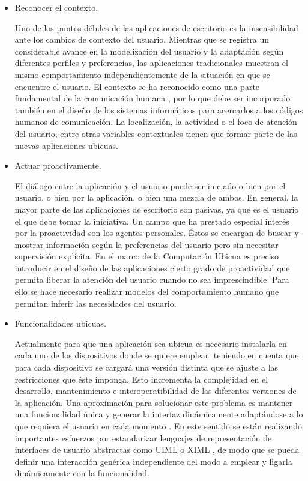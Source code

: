 \begin{itemize}
 
\item Reconocer el contexto. 

Uno de los puntos débiles de las aplicaciones de escritorio es la insensibilidad
ante los cambios de contexto del usuario.
Mientras que se registra un considerable avance en la modelización del usuario
y la adaptación según diferentes perfiles y preferencias, las aplicaciones
tradicionales muestran el mismo comportamiento independientemente de la
situación en que se encuentre el usuario. El contexto se ha reconocido como
una parte fundamental de la comunicación humana \cite{cap1.69}, por lo que
debe ser incorporado también en el diseño de los sistemas informáticos para
acercarlos a los códigos humanos de comunicación. La localización, la actividad o
el foco de atención del usuario, entre otras variables contextuales tienen que
formar parte de las nuevas aplicaciones ubicuas.

\item Actuar proactivamente. 

El diálogo entre la aplicación y el usuario puede
ser iniciado o bien por el usuario, o bien por la aplicación, o bien una
mezcla de ambos. En general, la mayor parte de las aplicaciones de escritorio
son pasivas, ya que es el usuario el que debe tomar la iniciativa. Un
campo que ha prestado especial interés por la proactividad son los agentes
personales. Éstos se encargan de buscar y mostrar información según la
preferencias del usuario pero sin necesitar supervisión explícita. En el marco
de la Computación Ubicua es preciso introducir en el diseño de las aplicaciones
cierto grado de proactividad que permita liberar la atención del usuario
cuando no sea imprescindible. Para ello se hace necesario realizar modelos
del comportamiento humano \cite{cap1.198} que permitan inferir las
necesidades del usuario.

\item Funcionalidades ubicuas. 

Actualmente para que una aplicación sea ubicua
es necesario instalarla en cada uno de los dispositivos donde se quiere emplear,
teniendo en cuenta que para cada dispositivo se cargará una versión distinta que
se ajuste a las restricciones que éste imponga. Esto incrementa la complejidad
en el desarrollo, mantenimiento e interoperatibilidad de las diferentes
versiones de la aplicación. Una aproximación para solucionar este problema es
mantener una funcionalidad única y generar la interfaz dinámicamente adaptándose
a lo que requiera el usuario en cada momento \cite{cap1.205}. En este
sentido se están realizando importantes esfuerzos por estandarizar lenguajes de
representación de interfaces de usuario abstractas como UIML \cite{cap1.16} o
XIML \cite{cap1.214}, de modo que se pueda definir una interacción genérica
independiente del modo a emplear y ligarla dinámicamente con la funcionalidad.
\end{itemize}

